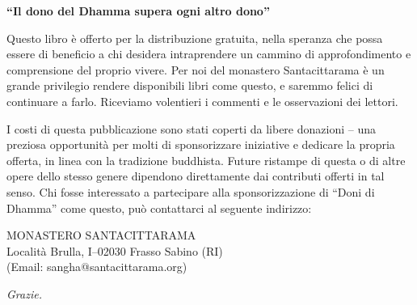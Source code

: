 \documentclass[11pt]{memoir}
\begin{document}
\cleardoublepage
{\thispagestyle{empty}\centering\setlength{\parskip}{1.5em}

\textbf{``Il dono del Dhamma supera ogni altro dono''}

Questo libro è offerto per la distribuzione gratuita, nella speranza che possa essere di beneficio a chi desidera intraprendere un cammino di approfondimento e comprensione del proprio vivere. Per noi del monastero Santacittarama è un grande privilegio rendere disponibili libri come questo, e saremmo felici di continuare a farlo. Riceviamo volentieri i commenti e le osservazioni dei lettori.

I costi di questa pubblicazione sono stati coperti da libere donazioni -- una preziosa opportunità per molti di sponsorizzare iniziative e dedicare la propria offerta, in linea con la tradizione buddhista. Future ristampe di questa o di altre opere dello stesso genere dipendono direttamente dai contributi offerti in tal senso. Chi fosse interessato a partecipare alla sponsorizzazione di ``Doni di Dhamma'' come questo, può contattarci al seguente indirizzo:

MONASTERO SANTACITTARAMA \\
Località Brulla, I–02030 Frasso Sabino (RI) \\
(Email: sangha@santacittarama.org)

\textit{Grazie.} 

}
\end{document}
